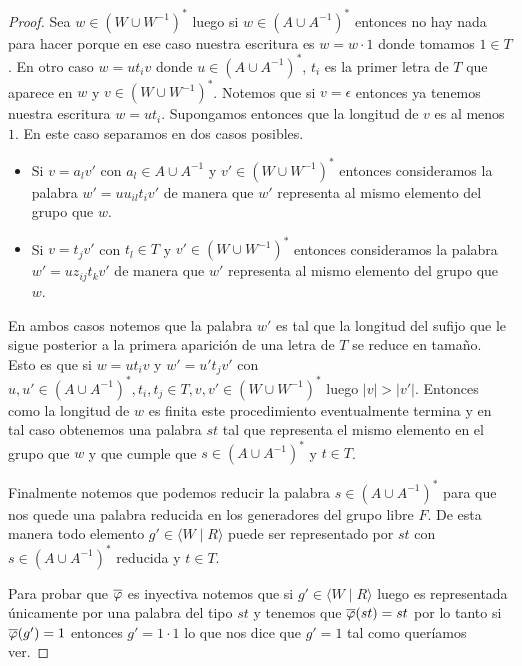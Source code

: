 \documentclass[tesis.tex]{subfiles}
\begin{document}
\begin{proof}
		

		Sea $w \in (W \cup W^{-1})^{*}$ luego si $w \in (A \cup A^{-1})^{*}$ entonces no hay nada para hacer porque en ese caso nuestra escritura es $w = w \cdot 1$ donde tomamos $1 \in T$.
		En otro caso $w = ut_{i}v$ donde $u \in (A \cup A^{-1})^{*}$, $t_{i}$ es la primer letra de $T$ que aparece en $w$ y $v \in (W \cup W^{-1})^{*}$.
		Notemos que si $v = \epsilon$ entonces ya tenemos nuestra escritura $w = ut_{i}$.
		Supongamos entonces que la longitud de $v$ es al menos $1$.
		En este caso separamos en dos casos posibles.
		\begin{itemize}
			\item Si $v = a_{l} v'$ con $a_{l} \in A \cup A^{-1}$ y $v' \in (W \cup W^{-1})^{*}$ entonces consideramos la palabra $w' = uu_{il}t_{i}v'$ de manera que $w'$ representa al mismo elemento del grupo que $w$.
			\item Si $v = t_{j} v'$ con $t_{l} \in T$ y $v' \in (W \cup W^{-1})^{*}$ entonces consideramos la palabra $w' = uz_{ij}t_{k}v'$ de manera que $w'$ representa al mismo elemento del grupo que $w$.
		\end{itemize} 
		En ambos casos notemos que la palabra $w'$ es tal que la longitud del sufijo que le sigue posterior a la primera aparición de una letra de $T$ se reduce en tamaño.
		Esto es que si $w = ut_{i}v$ y $w' = u't_{j}v'$ con $u,u' \in (A \cup A^{-1})^{*}, t_{i}, t_{j} \in T, v,v' \in (W \cup W^{-1})^{*}$ luego 
		$|v| > |v'|$.
		Entonces como la longitud de $w$ es finita este procedimiento eventualmente termina y en tal caso obtenemos una palabra $st$ tal que representa el mismo elemento en el grupo que $w$ y que cumple que $s \in (A \cup A^{-1})^{*}$ y $t \in T$.

		Finalmente notemos que podemos reducir la palabra $s \in (A \cup A^{-1})^{*}$ para que nos quede una palabra reducida en los generadores del grupo libre $F$.
		De esta manera todo elemento $g' \in \langle W \mid R\rangle$ puede ser representado por $st$ con $s \in (A \cup A^{-1})^{*}$ reducida y $t \in T$. 
		

		Para probar que $\overline{ \varphi}$ es inyectiva notemos que si $g' \in \langle W \mid R \rangle$ luego es representada únicamente por una palabra del tipo $st$ y tenemos que $\overline{\varphi}(st) = st$ por lo tanto si $\overline{\varphi}(g') = 1$ entonces $g' = 1 \cdot 1$ lo que nos dice que $g' = 1$ tal como queríamos ver.

	\end{proof}
\end{document}
